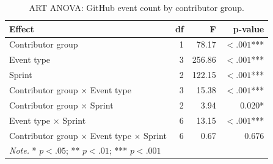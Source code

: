 \begin{table}[ht]
\centering
\footnotesize
\caption{ART ANOVA: GitHub event count by contributor group.}
\label{tab:gh-anova-contributor}
\begin{tabular}{l r r r}
\toprule
\textbf{Effect} & \textbf{df} & \textbf{F} & \textbf{p-value} \\
\midrule
Contributor group & 1 & 78.17 & $< .001$*** \\
Event type & 3 & 256.86 & $< .001$*** \\
Sprint & 2 & 122.15 & $< .001$*** \\
Contributor group $\times$ Event type & 3 & 15.38 & $< .001$*** \\
Contributor group $\times$ Sprint & 2 & 3.94 & 0.020* \\
Event type $\times$ Sprint & 6 & 13.15 & $< .001$*** \\
Contributor group $\times$ Event type $\times$ Sprint & 6 & 0.67 & 0.676 \\
\midrule
\multicolumn{4}{l}{\textit{Note.} * $p < .05$; ** $p < .01$; *** $p < .001$} \\
\bottomrule
\end{tabular}
\end{table}
